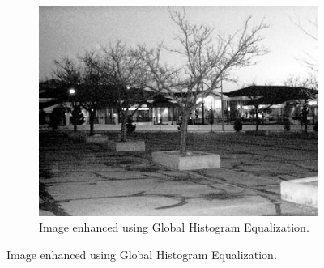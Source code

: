 \documentclass[a4paper, landscape]{article}
\begin{document}
\begin{figure}
    \begin{subfigure}{0.32\linewidth}
        \centering
        \includegraphics[width=\linewidth]{global_histogram_LC1.jpg}
        \caption{Image enhanced using Global Histogram Equalization.}
        \label{lc1_ghe}
    \end{subfigure}
\end{figure}
\end{document}
